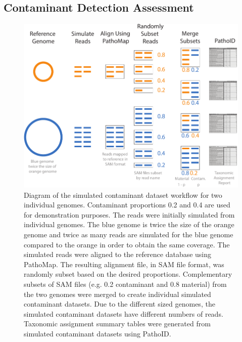 \documentclass[fleqn,10pt,lineno]{wlpeerj}\usepackage[]{graphicx}\usepackage[]{color}
\makeatletter
\def\maxwidth{ %
  \ifdim\Gin@nat@width>\linewidth
    \linewidth
  \else
    \Gin@nat@width
  \fi
}
\newenvironment{knitrout}{}{} %
\makeatother
\begin{document}
\subsection*{Contaminant Detection Assessment} 

\begin{knitrout}
\color{fgcolor}\begin{figure}
\includegraphics[width=\maxwidth]{figure/contam_simulation} \caption[Diagram of the simulated contaminant dataset workflow for two individual genomes]{Diagram of the simulated contaminant dataset workflow for two individual genomes. Contaminant proportions 0.2 and 0.4 are used for demonstration purposes. The reads were initially simulated from individual genomes. The blue genome is twice the size of the orange genome and twice as many reads are simulated for the blue genome compared to the orange in order to obtain the same coverage. The simulated reads were aligned to the reference database using PathoMap. The resulting alignment file, in SAM file format, was randomly subset based on the desired proportions. Complementary subsets of SAM files (e.g. 0.2 contaminant and 0.8 material) from the two genomes were merged to create individual simulated contaminant datasets.  Due to the different sized genomes, the simulated contaminant datasets have different numbers of reads. Taxonomic assignment summary tables were generated from simulated contaminant datasets using PathoID.}\label{fig:contam_simulation}
\end{figure}


\end{knitrout}
\end{document}
